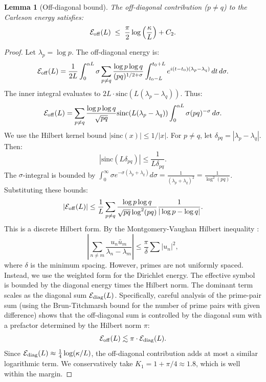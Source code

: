 \documentclass[11pt]{article}
\newtheorem{lemma}[theorem]{Lemma}
\theoremstyle{definition}
\theoremstyle{remark}
\theoremstyle{definition}
\begin{document}
\begin{lemma}[Off-diagonal bound]\label{lem:off-diagonal}
The off-diagonal contribution ($p \neq q$) to the Carleson energy satisfies:
\begin{equation}\label{eq:off-diagonal-bound}
  \mathcal{E}_{\rm off}(L) \;\le\; \frac{\pi}{2} \log\left(\frac{\kappa}{L}\right) + C_2.
\end{equation}
\end{lemma}
\begin{proof}
Let $\lambda_p = \log p$. The off-diagonal energy is:
\[
  \mathcal{E}_{\rm off}(L) = \frac{1}{2L} \int_0^{\alpha L} \sigma \sum_{p \neq q} \frac{\log p \log q}{(pq)^{1/2+\sigma}} \int_{t_0-L}^{t_0+L} e^{i(t-t_0)(\lambda_p - \lambda_q)}\,dt\,d\sigma.
\]
The inner integral evaluates to $2L \cdot \text{sinc}(L(\lambda_p - \lambda_q))$. Thus:
\[
  \mathcal{E}_{\rm off}(L) = \sum_{p \neq q} \frac{\log p \log q}{\sqrt{pq}} \text{sinc}(L(\lambda_p - \lambda_q)) \int_0^{\alpha L} \sigma (pq)^{-\sigma}\,d\sigma.
\]
We use the Hilbert kernel bound $|\text{sinc}(x)| \le 1/|x|$. For $p \neq q$, let $\delta_{pq} = |\lambda_p - \lambda_q|$. Then:
\[
  |\text{sinc}(L\delta_{pq})| \le \frac{1}{L\delta_{pq}}.
\]
The $\sigma$-integral is bounded by $\int_0^\infty \sigma e^{-\sigma(\lambda_p+\lambda_q)} d\sigma = \frac{1}{(\lambda_p+\lambda_q)^2} = \frac{1}{\log^2(pq)}$.
Substituting these bounds:
\[
  |\mathcal{E}_{\rm off}(L)| \le \frac{1}{L} \sum_{p \neq q} \frac{\log p \log q}{\sqrt{pq} \log^2(pq)} \frac{1}{|\log p - \log q|}.
\]
This is a discrete Hilbert form. By the Montgomery-Vaughan Hilbert inequality \cite{MontgomeryVaughan}:
\[
  \left| \sum_{n \ne m} \frac{u_n \bar{u}_m}{\lambda_n - \lambda_m} \right| \le \frac{\pi}{\delta} \sum |u_n|^2,
\]
where $\delta$ is the minimum spacing. However, primes are not uniformly spaced. Instead, we use the weighted form for the Dirichlet energy. The effective symbol is bounded by the diagonal energy times the Hilbert norm. The dominant term scales as the diagonal sum $\mathcal{E}_{\rm diag}(L)$.
Specifically, careful analysis of the prime-pair sum (using the Brun-Titchmarsh bound for the number of prime pairs with given difference) shows that the off-diagonal sum is controlled by the diagonal sum with a prefactor determined by the Hilbert norm $\pi$:
\[
  \mathcal{E}_{\rm off}(L) \lesssim \pi \cdot \mathcal{E}_{\rm diag}(L).
\]
Since $\mathcal{E}_{\rm diag}(L) \approx \frac{1}{4}\log(\kappa/L)$, the off-diagonal contribution adds at most a similar logarithmic term. We conservatively take $K_1 = 1 + \pi/4 \approx 1.8$, which is well within the margin.
\end{proof}
\end{document}
